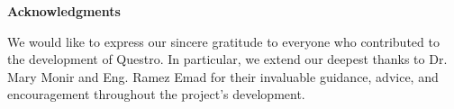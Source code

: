 \begin{center}
    \huge \textbf{Acknowledgments}
\end{center}

\vspace{0.5cm}

\large
We would like to express our sincere gratitude to everyone who contributed to the development of Questro. In particular, we extend our deepest thanks to Dr. Mary Monir and Eng. Ramez Emad for their invaluable guidance, advice, and encouragement throughout the project’s development.